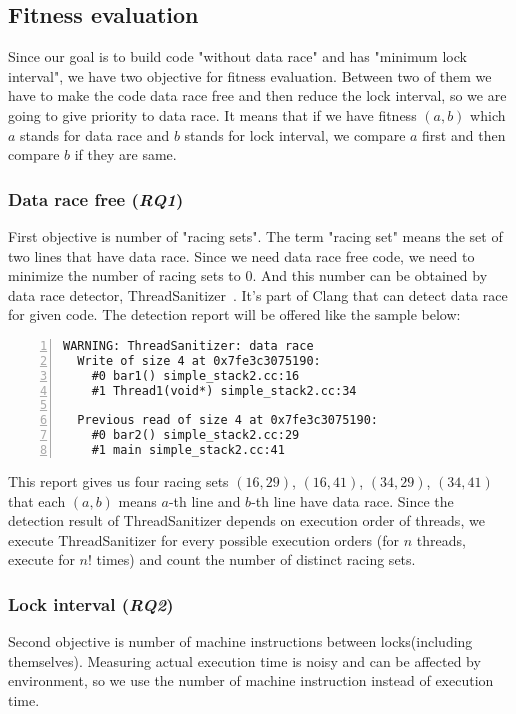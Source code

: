 \subsection{Fitness evaluation}
Since our goal is to build code "without data race" and has "minimum lock interval", we have two objective for fitness evaluation. Between two of them we have to make the code data race free and then reduce the lock interval, so we are going to give priority to data race. It means that if we have fitness $(a, b)$ which $a$ stands for data race and $b$ stands for lock interval, we compare $a$ first and then compare $b$ if they are same.

\subsubsection{Data race free (\textit{RQ1})}
First objective is number of "racing sets". The term "racing set" means the set of two lines that have data race. Since we need data race free code, we need to minimize the number of racing sets to 0. And this number can be obtained by data race detector, ThreadSanitizer~\cite{Serebryany:2009:TDR:1791194.1791203}. It's part of Clang that can detect data race for given code. The detection report will be offered like the sample below:

\begin{lstlisting}[frame=tb, xleftmargin=2em, framexleftmargin=1.5em, numbers=left]
WARNING: ThreadSanitizer: data race
  Write of size 4 at 0x7fe3c3075190:
    #0 bar1() simple_stack2.cc:16
    #1 Thread1(void*) simple_stack2.cc:34

  Previous read of size 4 at 0x7fe3c3075190:
    #0 bar2() simple_stack2.cc:29
    #1 main simple_stack2.cc:41
\end{lstlisting}

This report gives us four racing sets $(16, 29)$, $(16, 41)$, $(34, 29)$, $(34, 41)$ that each $(a, b)$ means $a$-th line and $b$-th line have data race. Since the detection result of ThreadSanitizer depends on execution order of threads, we execute ThreadSanitizer for every possible execution orders (for $n$ threads, execute for $n!$ times) and count the number of distinct racing sets.
 
\subsubsection{Lock interval (\textit{RQ2})}
Second objective is number of machine instructions between locks(including themselves). Measuring actual execution time is noisy and can be affected by environment, so we use the number of machine instruction instead of execution time.

